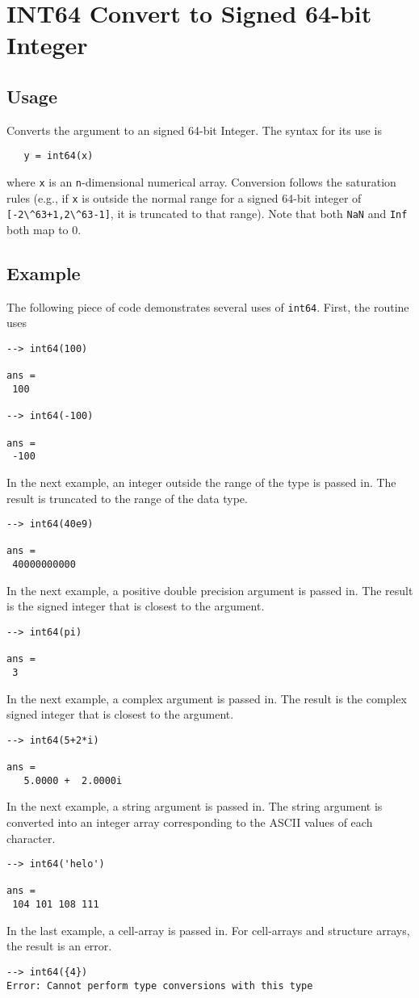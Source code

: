 \section{INT64 Convert to Signed 64-bit Integer}

\subsection{Usage}

Converts the argument to an signed 64-bit Integer.  The syntax
for its use is
\begin{verbatim}
   y = int64(x)
\end{verbatim}
where \verb|x| is an \verb|n|-dimensional numerical array.  Conversion
follows the saturation rules (e.g., if \verb|x| is outside the normal
range for a signed 64-bit integer of \verb|[-2\^63+1,2\^63-1]|, it is
truncated to that range).  Note that both \verb|NaN| and \verb|Inf| both map to 0.
\subsection{Example}

The following piece of code demonstrates several uses of \verb|int64|.  First, the routine uses
\begin{verbatim}
--> int64(100)

ans = 
 100 

--> int64(-100)

ans = 
 -100 
\end{verbatim}
In the next example, an integer outside the range  of the type is passed in.  
The result is truncated to the range of the data type.
\begin{verbatim}
--> int64(40e9)

ans = 
 40000000000 
\end{verbatim}
In the next example, a positive double precision argument is passed in.  The 
result is the signed integer that is closest to the argument.
\begin{verbatim}
--> int64(pi)

ans = 
 3 
\end{verbatim}
In the next example, a complex argument is passed in.  The result is the 
complex signed integer that is closest to the argument.
\begin{verbatim}
--> int64(5+2*i)

ans = 
   5.0000 +  2.0000i 
\end{verbatim}
In the next example, a string argument is passed in.  The string argument is 
converted into an integer array corresponding to the ASCII values of each character.
\begin{verbatim}
--> int64('helo')

ans = 
 104 101 108 111 
\end{verbatim}
In the last example, a cell-array is passed in.  For cell-arrays and structure 
arrays, the result is an error.
\begin{verbatim}
--> int64({4})
Error: Cannot perform type conversions with this type
\end{verbatim}
